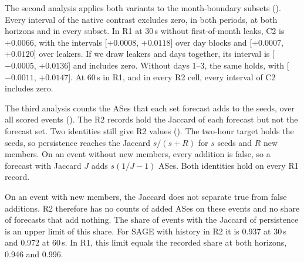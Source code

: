 The second analysis applies both variants to the month-boundary subsets ().
Every interval of the native contrast excludes zero, in both periods, at both horizons and in every subset.
In R1 at 30\,s without first-of-month leaks, C2 is $+0.0066$, with the intervals [$+0.0008$, $+0.0118$] over day blocks and [$+0.0007$, $+0.0120$] over leakers.
If we draw leakers and days together, its interval is [$-0.0005$, $+0.0136$] and includes zero.
Without days 1--3, the same holds, with [$-0.0011$, $+0.0147$].
At 60\,s in R1, and in every R2 cell, every interval of C2 includes zero.


The third analysis counts the ASes that each set forecast adds to the seeds, over all scored events ().
The R2 records hold the Jaccard of each forecast but not the forecast set.
Two identities still give R2 values ().
The two-hour target holds the seeds, so persistence reaches the Jaccard $s/(s+R)$ for $s$ seeds and $R$ new members.
On an event without new members, every addition is false, so a forecast with Jaccard $J$ adds $s(1/J-1)$ ASes.
Both identities hold on every R1 record.

On an event with new members, the Jaccard does not separate true from false additions.
R2 therefore has no counts of added ASes on these events and no share of forecasts that add nothing.
The share of events with the Jaccard of persistence is an upper limit of this share.
For SAGE with history in R2 it is 0.937 at 30\,s and 0.972 at 60\,s.
In R1, this limit equals the recorded share at both horizons, 0.946 and 0.996.


